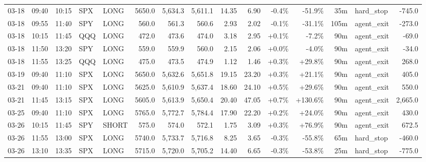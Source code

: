 \documentclass[11pt,a4paper,twoside]{article}
\begin{document}
\begin{landscape}
\begin{center}
\begin{longtable}{>{\color{txtmain}}l l l l l r r r r r r r r >{\color{txtmain}}l r}
03-18 & 09:40 & 10:15 & SPX & LONG & 5650.0 & 5,634.3 & 5,611.1 & 14.35 & 6.90 & \textcolor{lossred}{-0.4\%} & \textcolor{lossred}{-51.9\%} & 35m & hard\_stop & \textcolor{lossred}{-745.0} \\
03-18 & 09:55 & 11:40 & SPY & LONG & 560.0 & 561.3 & 560.6 & 2.93 & 2.02 & \textcolor{lossred}{-0.1\%} & \textcolor{lossred}{-31.1\%} & 105m & agent\_exit & \textcolor{lossred}{-273.0} \\
03-18 & 10:15 & 11:45 & QQQ & LONG & 472.0 & 473.6 & 474.0 & 3.18 & 2.95 & \textcolor{wingreen}{+0.1\%} & \textcolor{lossred}{-7.2\%} & 90m & agent\_exit & \textcolor{lossred}{-69.0} \\
03-18 & 11:50 & 13:20 & SPY & LONG & 559.0 & 559.9 & 560.0 & 2.15 & 2.06 & \textcolor{wingreen}{+0.0\%} & \textcolor{lossred}{-4.0\%} & 90m & agent\_exit & \textcolor{lossred}{-34.0} \\
03-18 & 11:55 & 13:25 & QQQ & LONG & 475.0 & 473.5 & 474.9 & 1.12 & 1.46 & \textcolor{wingreen}{+0.3\%} & \textcolor{wingreen}{+29.8\%} & 90m & agent\_exit & \textcolor{wingreen}{268.0} \\
03-19 & 09:40 & 11:10 & SPX & LONG & 5650.0 & 5,632.6 & 5,651.8 & 19.15 & 23.20 & \textcolor{wingreen}{+0.3\%} & \textcolor{wingreen}{+21.1\%} & 90m & agent\_exit & \textcolor{wingreen}{405.0} \\
03-21 & 09:40 & 11:10 & SPX & LONG & 5625.0 & 5,610.9 & 5,637.4 & 18.60 & 24.10 & \textcolor{wingreen}{+0.5\%} & \textcolor{wingreen}{+29.6\%} & 90m & agent\_exit & \textcolor{wingreen}{550.0} \\
03-21 & 11:45 & 13:15 & SPX & LONG & 5605.0 & 5,613.9 & 5,650.4 & 20.40 & 47.05 & \textcolor{wingreen}{+0.7\%} & \textcolor{wingreen}{+130.6\%} & 90m & agent\_exit & \textcolor{wingreen}{2,665.0} \\
03-25 & 09:40 & 11:10 & SPX & LONG & 5765.0 & 5,772.7 & 5,784.4 & 17.90 & 22.20 & \textcolor{wingreen}{+0.2\%} & \textcolor{wingreen}{+24.0\%} & 90m & agent\_exit & \textcolor{wingreen}{430.0} \\
03-26 & 10:15 & 11:45 & SPY & SHORT & 575.0 & 574.0 & 572.1 & 1.75 & 3.09 & \textcolor{wingreen}{+0.3\%} & \textcolor{wingreen}{+76.9\%} & 90m & agent\_exit & \textcolor{wingreen}{672.5} \\
03-26 & 11:55 & 13:00 & SPX & LONG & 5740.0 & 5,733.7 & 5,716.8 & 8.25 & 3.65 & \textcolor{lossred}{-0.3\%} & \textcolor{lossred}{-55.8\%} & 65m & hard\_stop & \textcolor{lossred}{-460.0} \\
03-26 & 13:10 & 13:35 & SPX & LONG & 5715.0 & 5,720.0 & 5,705.2 & 14.40 & 6.65 & \textcolor{lossred}{-0.3\%} & \textcolor{lossred}{-53.8\%} & 25m & hard\_stop & \textcolor{lossred}{-775.0} \\

\end{longtable}
\end{center}
\end{landscape}
\end{document}
